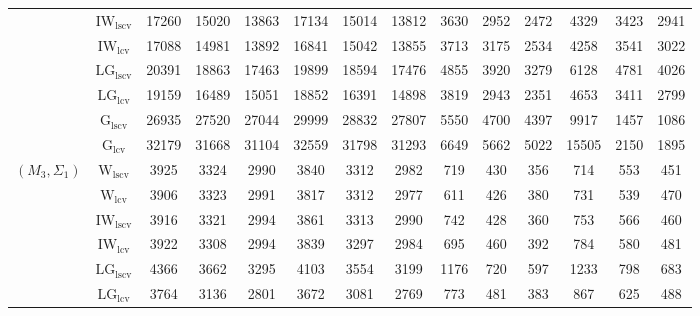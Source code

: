 \begin{table}[!ht]
{\begin{tabular}{@{}cc|ccc|ccc|ccc|ccc@{}}
 & $\mathrm{IW}_{\mathrm{lscv}}$ & \cellcolor{black!10}17260 & \cellcolor{black!10}15020 & \cellcolor{black!30}13863 & \cellcolor{black!10}17134 & \cellcolor{black!30}15014 & \cellcolor{black!30}13812 & \cellcolor{black!10}3630 & 2952 & 2472 & 4329 & 3423 & 2941 \\ 
 & $\mathrm{IW}_{\mathrm{lcv}}$ & \cellcolor{black!30}17088 & \cellcolor{black!30}14981 & \cellcolor{black!10}13892 & \cellcolor{black!30}16841 & \cellcolor{black!10}15042 & \cellcolor{black!10}13855 & 3713 & 3175 & 2534 & 4258 & 3541 & 3022 \\ 
 & $\mathrm{LG}_{\mathrm{lscv}}$ & 20391 & 18863 & 17463 & 19899 & 18594 & 17476 & 4855 & 3920 & 3279 & 6128 & 4781 & 4026 \\ 
 & $\mathrm{LG}_{\mathrm{lcv}}$ & 19159 & 16489 & 15051 & 18852 & 16391 & 14898 & 3819 & 2943 & 2351 & 4653 & 3411 & 2799 \\ 
 & $\mathrm{G}_{\mathrm{lscv}}$ & 26935 & 27520 & 27044 & 29999 & 28832 & 27807 & 5550 & 4700 & 4397 & 9917 & \cellcolor{black!30}1457 & \cellcolor{black!30}1086 \\ 
 & $\mathrm{G}_{\mathrm{lcv}}$ & 32179 & 31668 & 31104 & 32559 & 31798 & 31293 & 6649 & 5662 & 5022 & 15505 & \cellcolor{black!10}2150 & \cellcolor{black!10}1895 \\ 
\midrule
$(M_3,\Sigma_1)$ & $\mathrm{W}_{\mathrm{lscv}}$ & 3925 & 3324 & \cellcolor{black!10}2990 & 3840 & 3312 & 2982 & 719 & 430 & \cellcolor{black!10}356 & 714 & 553 & \cellcolor{black!10}451 \\ 
 & $\mathrm{W}_{\mathrm{lcv}}$ & \cellcolor{black!10}3906 & 3323 & 2991 & \cellcolor{black!10}3817 & 3312 & \cellcolor{black!10}2977 & 611 & \cellcolor{black!10}426 & 380 & 731 & \cellcolor{black!10}539 & 470 \\ 
 & $\mathrm{IW}_{\mathrm{lscv}}$ & 3916 & 3321 & 2994 & 3861 & 3313 & 2990 & 742 & 428 & 360 & 753 & 566 & 460 \\ 
 & $\mathrm{IW}_{\mathrm{lcv}}$ & 3922 & \cellcolor{black!10}3308 & 2994 & 3839 & \cellcolor{black!10}3297 & 2984 & 695 & 460 & 392 & 784 & 580 & 481 \\ 
 & $\mathrm{LG}_{\mathrm{lscv}}$ & 4366 & 3662 & 3295 & 4103 & 3554 & 3199 & 1176 & 720 & 597 & 1233 & 798 & 683 \\ 
 & $\mathrm{LG}_{\mathrm{lcv}}$ & \cellcolor{black!30}3764 & \cellcolor{black!30}3136 & \cellcolor{black!30}2801 & \cellcolor{black!30}3672 & \cellcolor{black!30}3081 & \cellcolor{black!30}2769 & 773 & 481 & 383 & 867 & 625 & 488 \\ 

\end{tabular}}
\end{table}

